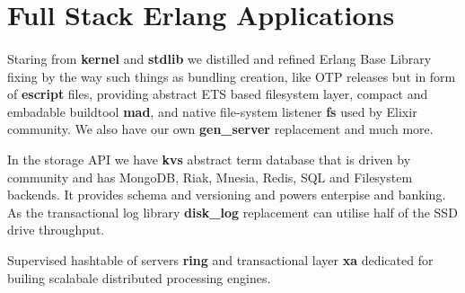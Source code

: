\documentclass[11pt]{article}
\begin{document}


\section*{Full Stack Erlang Applications}
\paragraph{}

Staring from {\bf kernel} and {\bf stdlib} we distilled and refined Erlang Base Library
fixing by the way such things as bundling creation, like OTP releases
but in form of {\bf escript} files, providing abstract ETS based filesystem layer,
compact and embadable buildtool {\bf mad}, and native file-system listener {\bf fs}
used by Elixir community. We also have our own {\bf gen_server} replacement and much more.

In the storage API we have {\bf kvs} abstract term database that is driven by community and
has MongoDB, Riak, Mnesia, Redis, SQL and Filesystem backends. It provides schema and
versioning and powers enterpise and banking. As the transactional log library {\bf disk_log}
replacement can utilise half of the SSD drive throughput.

Supervised hashtable of servers {\bf ring} and transactional layer {\bf xa} dedicated
for builing scalabale distributed processing engines.



\end{document}
